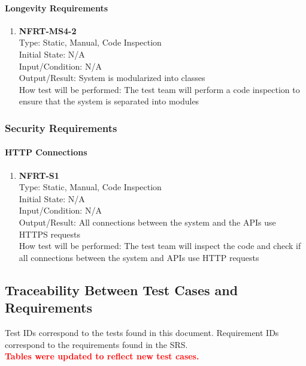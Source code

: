 \documentclass[12pt, titlepage]{article}
\begin{document}
\paragraph{Longevity Requirements}
\begin{enumerate}
    \item{\textbf{NFRT-MS4-2}}\\
    Type: Static, Manual, Code Inspection\\
    Initial State: N/A\\
    Input/Condition: N/A\\
    Output/Result: System is modularized into classes\\
    How test will be performed: The test team will perform a code inspection to ensure that the system is separated into modules
\end{enumerate}

\subsubsection{Security Requirements}
\paragraph{HTTP Connections}
\begin{enumerate}
    \item{\textbf{NFRT-S1}}\\
    Type: Static, Manual, Code Inspection\\
    Initial State: N/A\\
    Input/Condition: N/A\\
    Output/Result: All connections between the system and the APIs use HTTPS requests\\
    How test will be performed: The test team will inspect the code and check if all connections between the system and APIs use HTTP requests
\end{enumerate}

\newpage

\subsection{Traceability Between Test Cases and Requirements}
\noindent Test IDs correspond to the tests found in this document. Requirement IDs correspond to the requirements found in the SRS. \\
\textcolor{red}{\textbf{Tables were updated to reflect new test cases.}}
\end{document}
